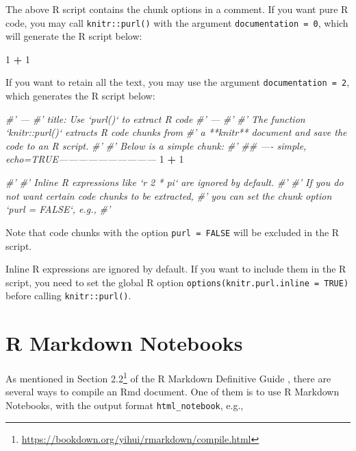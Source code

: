 \documentclass[
  11pt,
]{krantz}
\newenvironment{Shaded}{\begin{snugshade}}{\end{snugshade}}
\newcommand{\CommentTok}[1]{\textcolor[rgb]{0.37,0.37,0.37}{\textit{#1}}}
\newcommand{\DecValTok}[1]{\textcolor[rgb]{0.06,0.06,0.06}{#1}}
\newcommand{\OperatorTok}[1]{\textcolor[rgb]{0.43,0.43,0.43}{\textbf{#1}}}
\newcommand{\StringTok}[1]{\textcolor[rgb]{0.5,0.5,0.5}{#1}}
\renewcommand{\href}[2]{#2\footnote{\url{#1}}}
\begin{document}
The above R script contains the chunk options in a comment. If you want pure R code, you may call \texttt{knitr::purl()} with the argument \texttt{documentation\ =\ 0}, which will generate the R script below:

\begin{Shaded}
\begin{Highlighting}[]
\DecValTok{1} \OperatorTok{+}\StringTok{ }\DecValTok{1}
\end{Highlighting}
\end{Shaded}

If you want to retain all the text, you may use the argument \texttt{documentation\ =\ 2}, which generates the R script below:

\begin{Shaded}
\begin{Highlighting}[]
\CommentTok{#' ---}
\CommentTok{#' title: Use `purl()` to extract R code}
\CommentTok{#' ---}
\CommentTok{#' }
\CommentTok{#' The function `knitr::purl()` extracts R code chunks from}
\CommentTok{#' a **knitr** document and save the code to an R script.}
\CommentTok{#' }
\CommentTok{#' Below is a simple chunk:}
\CommentTok{#' }
\CommentTok{## ---- simple, echo=TRUE------------------------------}
\DecValTok{1} \OperatorTok{+}\StringTok{ }\DecValTok{1}

\CommentTok{#' }
\CommentTok{#' Inline R expressions like `r 2 * pi` are ignored by default.}
\CommentTok{#' }
\CommentTok{#' If you do not want certain code chunks to be extracted,}
\CommentTok{#' you can set the chunk option `purl = FALSE`, e.g.,}
\CommentTok{#' }
\end{Highlighting}
\end{Shaded}

Note that code chunks with the option \texttt{purl\ =\ FALSE} will be excluded in the R script.

Inline R expressions are ignored by default. If you want to include them in the R script, you need to set the global R option \texttt{options(knitr.purl.inline\ =\ TRUE)} before calling \texttt{knitr::purl()}.

\hypertarget{notebook}{%
\section{R Markdown Notebooks}\label{notebook}}

As mentioned in \href{https://bookdown.org/yihui/rmarkdown/compile.html}{Section 2.2} of the R Markdown Definitive Guide \citep{rmarkdown2018}, there are several ways to compile an Rmd document. One of them is to use R Markdown Notebooks, with the output format \texttt{html\_notebook}, e.g.,
\end{document}
